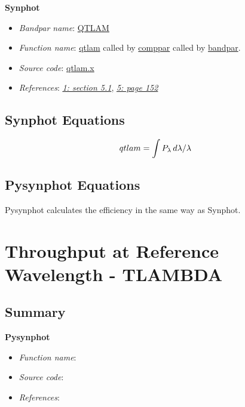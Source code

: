 \documentclass[letterpaper,10pt,english]{sphinxtsr}
\begin{document}
\textbf{Synphot}
\begin{itemize}
\item {} 
\emph{Bandpar name}: \href{https://svn.stsci.edu/trac/ssb/stsci\_python/browser/stsdas/trunk/stsdas/pkg/hst\_calib/synphot/doc/bandpar.hlp}{QTLAM}

\item {} 
\emph{Function name}: \href{https://svn.stsci.edu/trac/ssb/stsci\_python/browser/stsdas/trunk/stsdas/pkg/hst\_calib/synphot/newlib/qtlam.x}{qtlam}
called by \href{https://svn.stsci.edu/trac/ssb/stsci\_python/browser/stsdas/trunk/stsdas/pkg/hst\_calib/synphot/bandpar/comppar.x}{comppar} called by \href{https://svn.stsci.edu/trac/ssb/stsci\_python/browser/stsdas/trunk/stsdas/pkg/hst\_calib/synphot/bandpar/bandpar.x}{bandpar}.

\item {} 
\emph{Source code}: \href{https://svn.stsci.edu/trac/ssb/stsci\_python/browser/stsdas/trunk/stsdas/pkg/hst\_calib/synphot/newlib/qtlam.x}{qtlam.x}

\item {} 
\emph{References}: {\hyperref[references:ref1]{\emph{1: section 5.1}}}, {\hyperref[references:ref5]{\emph{5: page 152}}}

\end{itemize}


\section{Synphot Equations}
\label{main:id38}\begin{gather}
\begin{split}qtlam = \int P_{\lambda}\,d\lambda/\lambda\end{split}\notag
\end{gather}

\section{Pysynphot Equations}
\label{main:id39}
Pysynphot calculates the efficiency in the same way as Synphot.


\chapter{Throughput at Reference Wavelength - TLAMBDA}
\label{main:throughput-at-reference-wavelength-tlambda}

\section{Summary}
\label{main:id40}
\textbf{Pysynphot}
\begin{itemize}
\item {} 
\emph{Function name}:

\item {} 
\emph{Source code}:

\item {} 
\emph{References}:

\end{itemize}
\end{document}

